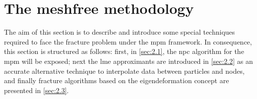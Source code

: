 \message{ !name(2020_EFM_MPM_Eigensoftening.tex)}\documentclass[preprint,12pt,a4paper]{elsarticle}
\begin{document}
\section{The meshfree methodology}
\label{sec:2}

The aim of this section is to describe and introduce some special
techniques required to face the fracture problem under the \acrshort{mpm}
framework. In consequence, this section is structured as follows: first, in
\ref{sec:2.1}, the \acrfull{npc} algorithm for the \acrshort{mpm}
will be exposed; next the \acrshort{lme} approximants are
introduced in \ref{sec:2.2} as an accurate alternative technique to
interpolate data between particles and nodes, and finally fracture
algorithms based on the eigendeformation concept are presented in
\ref{sec:2.3}.
\end{document}

